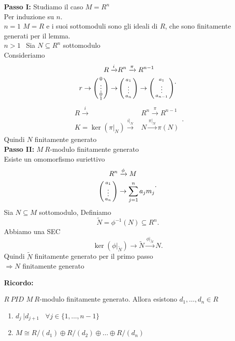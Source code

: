 \documentclass[12px]{article}
\begin{document}
	\begin{dimo}
		\textbf{Passo I:} Studiamo il caso $M = R^n$ \\
		Per induzione su $n$.\\
		$n = 1$  $M = R$ e i suoi sottomoduli sono gli ideali di  $R$, che sono finitamente generati per il lemma. \\
		$n > 1 \ \ $ Sia  $N\subseteq R^n$ sottomodulo\\
		Consideriamo
		\[
		\begin{aligned}
			R \xrightarrow{i} &R^n \xrightarrow{\pi} R^{n-1}\\
			r \rightarrow \left(\begin{smallmatrix} 0\\ \vdots\\0 \\ 1\end{smallmatrix}\right) \rightarrow& \left(\begin{smallmatrix}a_1\\\vdots\\a_n\end{smallmatrix}\right) \rightarrow\left(\begin{smallmatrix}a_1\\\vdots\\a_{n-1}\end{smallmatrix}\right)
		\end{aligned}
		.\] 
		\[
		\begin{aligned}
			R \xrightarrow i &R^n \xrightarrow \pi R^{n-1}\\
			K = \ker(\pi|_N) \xrightarrow {i|_N} &N \xrightarrow {\pi|_N} \pi(N)

		\end{aligned}
		.\] 
		Quindi $N$ finitamente generato\\
		\textbf{Passo II:} $M\ R$-modulo finitamente generato\\
		Esiste un omomorfismo suriettivo
		\[
		\begin{aligned}
			R^n &\xrightarrow \phi M\\
			 \left(\begin{smallmatrix}a_1\\\vdots\\a_n\end{smallmatrix}\right) &\rightarrow \sum^{n}_{j = 1}a_jm_j
		\end{aligned}
		.\] 
		Sia $N\subseteq M$ sottomodulo, Definiamo
		 \[
			 \tilde N = \phi^{-1}(N)\subseteq R^n
		.\] 
		Abbiamo una SEC
		\[
			\ker(\phi|_{\tilde N}) \rightarrow\tilde N \xrightarrow{\phi|_{\tilde N}} N
		.\] 
		Quindi $\tilde N$ finitamente generato per il primo passo\\
		 $ \Rightarrow N$ finitamente generato
	\end{dimo}
	\textbf{Ricordo:}
	\begin{teo}[di struttura]
		$R \ PID$  $M\ R$-modulo finitamente generato. Allora esistono $d_1,\ldots, d_n\in R$
		\begin{enumerate}
			\item $d_j\ | d_{j+1}\ \ \ \ \forall j\in \{1,\ldots,n-1\}$
			\item  $M\cong R/(d_1)\oplus R/(d_2)\oplus \ldots\oplus R/(d_n)$
		\end{enumerate}
	\end{teo}
\end{document}
